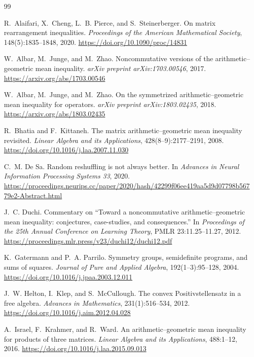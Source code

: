 \documentclass[11pt]{article}
\begin{document}
\begin{thebibliography}{99}

R.~Alaifari, X.~Cheng, L.~B. Pierce, and S.~Steinerberger.
On matrix rearrangement inequalities.
\emph{Proceedings of the American Mathematical Society},
148(5):1835--1848, 2020.
\url{https://doi.org/10.1090/proc/14831}

W.~Albar, M.~Junge, and M.~Zhao.
Noncommutative versions of the arithmetic--geometric mean inequality.
\emph{arXiv preprint arXiv:1703.00546}, 2017.
\url{https://arxiv.org/abs/1703.00546}

W.~Albar, M.~Junge, and M.~Zhao.
On the symmetrized arithmetic--geometric mean inequality for operators.
\emph{arXiv preprint arXiv:1803.02435}, 2018.
\url{https://arxiv.org/abs/1803.02435}

R.~Bhatia and F.~Kittaneh.
The matrix arithmetic--geometric mean inequality revisited.
\emph{Linear Algebra and its Applications}, 428(8--9):2177--2191, 2008.
\url{https://doi.org/10.1016/j.laa.2007.11.030}

C.~M. De Sa.
Random reshuffling is not always better.
In \emph{Advances in Neural Information Processing Systems 33}, 2020.
\url{https://proceedings.neurips.cc/paper/2020/hash/42299f06ee419aa5d9d07798b56779e2-Abstract.html}

J.~C. Duchi.
Commentary on ``Toward a noncommutative arithmetic--geometric mean
inequality: conjectures, case-studies, and consequences.''
In \emph{Proceedings of the 25th Annual Conference on Learning Theory},
PMLR 23:11.25--11.27, 2012.
\url{https://proceedings.mlr.press/v23/duchi12/duchi12.pdf}

K.~Gatermann and P.~A. Parrilo.
Symmetry groups, semidefinite programs, and sums of squares.
\emph{Journal of Pure and Applied Algebra}, 192(1--3):95--128, 2004.
\url{https://doi.org/10.1016/j.jpaa.2003.12.011}

J.~W. Helton, I.~Klep, and S.~McCullough.
The convex Positivstellensatz in a free algebra.
\emph{Advances in Mathematics}, 231(1):516--534, 2012.
\url{https://doi.org/10.1016/j.aim.2012.04.028}

A.~Israel, F.~Krahmer, and R.~Ward.
An arithmetic--geometric mean inequality for products of three matrices.
\emph{Linear Algebra and its Applications}, 488:1--12, 2016.
\url{https://doi.org/10.1016/j.laa.2015.09.013}


\end{thebibliography}
\end{document}
